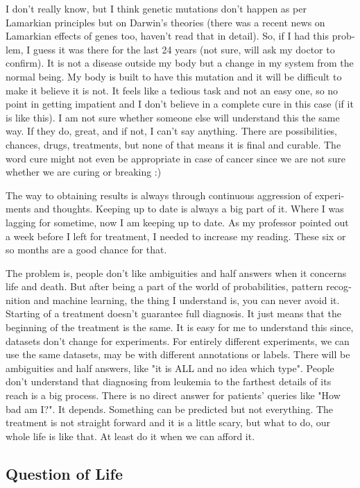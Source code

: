 \begin{english}
I don't really know, but I think genetic mutations don't happen as per Lamarkian principles but on Darwin's 
theories (there was a recent news on Lamarkian effects of genes too, haven't read that in detail). 
So, if I had this problem, I guess it was there for the last 24 years (not sure, will ask my doctor 
to confirm). It is not a disease outside my body but a change in my system from the normal being. My 
body is built to have this mutation and it will be difficult to make it believe it is not. It 
feels like a tedious task and not an easy one, so no point in getting impatient and I don't believe in 
a complete cure in this case (if it is like this). I am not sure whether someone else will 
understand this the same way. If they do, great, and if not, I can't say anything. There are 
possibilities, chances, drugs, treatments, but none of that  means it is final and curable. The 
word cure might not even be appropriate in case of cancer since we are not sure whether we are curing 
or breaking :)

The way to obtaining results is always through continuous aggression of experiments and thoughts. Keeping 
up to date is always a big part of it. Where I was lagging for sometime, now I am keeping up to date. 
As my professor pointed out a week before I left for treatment, I needed to increase my reading. 
These six or so months are a good chance for that. 

The problem is, people don't like ambiguities and half answers when it concerns life and death. 
But after being a part of the world of probabilities, pattern recognition and machine learning, the thing 
I understand is, you can never avoid it. Starting of a treatment doesn't guarantee full diagnosis. 
It just means that the beginning of the treatment is the same. It is easy for me to understand this since, 
datasets don't change for experiments. For entirely different experiments, we can use the same datasets, 
may be with different annotations or labels. There will be ambiguities and half answers, 
like "it is ALL and no idea which type". People don't understand that diagnosing from leukemia to 
the farthest details of its reach is a big process. There is no direct answer for patients' queries 
like "How bad am I?". It depends. Something can be predicted but not everything. The treatment is not 
straight forward and it is a little scary, but what to do, our whole life is like that. At least do it 
when we can afford it. 

\subsection*{Question of Life} 


\end{english}
